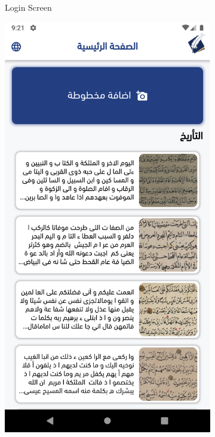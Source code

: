 \begin{figure}[H]
\begin{subfigure}[b]{0.3\textwidth}
         \caption{Login Screen}
         \label{fig:mobile-login-screen}
     \end{subfigure}
     \hfill
      \begin{subfigure}[b]{0.3\textwidth}
         \centering
         \includegraphics[width=\textwidth]{images/app/mobile/mobile-2.png}

\end{subfigure}
\end{figure}
